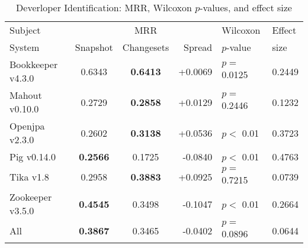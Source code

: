 \begin{table}[t]
\centering
\caption{Deverloper Identification: MRR, Wilcoxon $p$-values, and effect size}
\begin{tabular}{l|ccr|ll}
\toprule
Subject & & MRR & & Wilcoxon & Effect \\
System  &  Snapshot & Changesets & Spread & $p$-value & size \\
\midrule
Bookkeeper v4.3.0 & 0.6343 & {\bf 0.6413 } & +0.0069 & $p = $ 0.0125 & 0.2449 \\
Mahout v0.10.0 & 0.2729 & {\bf 0.2858 } & +0.0129 & $p = $ 0.2446 & 0.1232 \\
Openjpa v2.3.0 & 0.2602 & {\bf 0.3138 } & +0.0536 & $p < $ 0.01 & 0.3723 \\
Pig v0.14.0 & {\bf 0.2566 } & 0.1725 & -0.0840 & $p < $ 0.01 & 0.4763 \\
Tika v1.8 & 0.2958 & {\bf 0.3883 } & +0.0925 & $p = $ 0.7215 & 0.0739 \\
Zookeeper v3.5.0 & {\bf 0.4545 } & 0.3498 & -0.1047 & $p < $ 0.01 & 0.2664 \\
\midrule
All & {\bf 0.3867 } & 0.3465 & -0.0402 & $p = $ 0.0896 & 0.0644 \\
\bottomrule
\end{tabular}
\label{table:triage_rq1}
\end{table}
